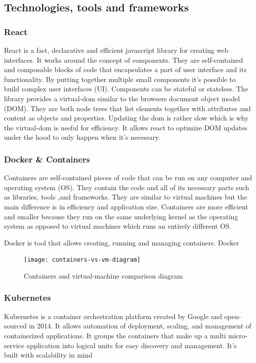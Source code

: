 \subsection{Technologies, tools and frameworks}
\subsubsection{React}
React is a fast, declarative and efficient javascript library for creating web interfaces. It works around the concept of components. They are self-contained and composable blocks of code that encapsulates a part of user interface and its functionality. By putting together multiple small components it's possible to build complex user interfaces (UI). Components can be stateful or stateless.
The library provides a virtual-dom similar to the browsers document object model (DOM). They are both node trees that list elements together with attributes and content as objects and properties. Updating the dom is rather slow which is why the virtual-dom is useful for efficiency. It allows react to optimize DOM updates under the hood to only happen when it's necessary.
\subsubsection{Docker \& Containers}
Containers are self-contained pieces of code that can be run on any computer and operating system (OS). They contain the code and all of its necessary parts such as libraries, tools ,and frameworks. They are similar to virtual machines but the main difference is in efficiency and application size. Containers are more efficient and smaller because they run on the same underlying kernel as the operating system as opposed to virtual machines which runs an entirely different OS.

Docker is tool that allows creating, running and managing containers.
Docker

\begin{figure}[h!]
    \texttt{[image: containers-vs-vm-diagram]}
    \caption{Containers and virtual-machine comparison diagram}
\end{figure}

\subsubsection{Kubernetes}
Kubernetes is a container orchestration platform created by Google and open-sourced in 2014. It allows automation of deployment, scaling, and management of containerized applications. It groups the containers that make up a multi micro-service application into logical units for easy discovery and management. It's built with scalability in mind 

